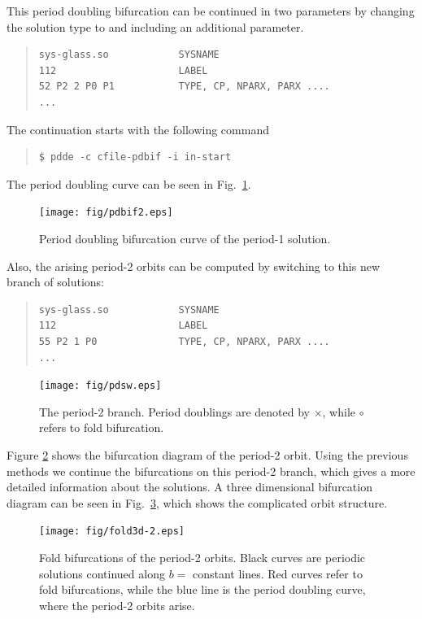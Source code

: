 \documentclass[10pt,a4paper]{ddedoc}
\begin{document}
This period doubling bifurcation can be continued in two parameters 
by changing the solution type to  and including an additional
parameter.
{ \small \begin{quote} \begin{lstlisting}[basicstyle=\tt,frame=single]
sys-glass.so            SYSNAME
112                     LABEL
52 P2 2 P0 P1           TYPE, CP, NPARX, PARX ....
...
\end{lstlisting} \end{quote} } \noindent
The continuation starts with the following command
{ \small \begin{quote} \begin{lstlisting}[basicstyle=\tt,frame=single]
$ pdde -c cfile-pdbif -i in-start
\end{lstlisting} \end{quote} } \noindent
The period doubling curve can be seen in Fig.\ \ref{pdbif}.
\begin{figure}[bth!]
\begin{center}
\texttt{[image: fig/pdbif2.eps]}
\end{center}
\caption{Period doubling bifurcation curve of the period-1 solution.}
\label{pdbif}
\end{figure}
Also, the arising period-2 orbits can be computed by switching to this new
branch of solutions:
{ \small \begin{quote} \begin{lstlisting}[basicstyle=\tt,frame=single]
sys-glass.so            SYSNAME
112                     LABEL
55 P2 1 P0              TYPE, CP, NPARX, PARX ....
...
\end{lstlisting} \end{quote} } \noindent
%
\begin{figure}[bth!]
\begin{center}
\texttt{[image: fig/pdsw.eps]}
\end{center}
\caption{The period-2 branch. Period doublings are denoted by $\times$, while
$\circ$ refers to fold bifurcation. }
\label{pdsw}
\end{figure}
Figure \ref{pdsw} shows the bifurcation diagram of the period-2 orbit. Using the
previous methods we continue the bifurcations on this period-2 branch, which
gives a more detailed information about the solutions. A three dimensional
bifurcation diagram can be seen in Fig.\ \ref{pdfold}, which shows the
complicated orbit structure.
\begin{figure}[bth!]
\begin{center}
\texttt{[image: fig/fold3d-2.eps]}
\end{center}
\caption{Fold bifurcations of the period-2 orbits. Black curves are periodic
solutions continued along $b=$ constant lines. Red curves refer to fold
bifurcations, while the blue line is the period doubling curve, where the
period-2 orbits arise. }
\label{pdfold}
\end{figure}
\end{document}

